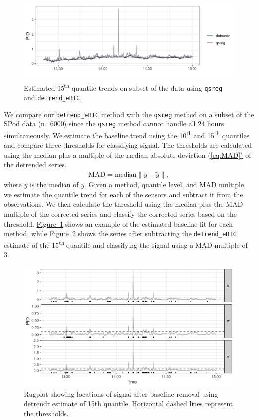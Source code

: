\documentclass[aoas]{imsart}
\newcommand{\Eqn}[1]{\hyperref[eq:#1]{{\rm (\ref*{eq:#1})}}} %
\newcommand{\Fig}[1]{\hyperref[fig:#1]{Figure~\ref*{fig:#1}}} %
\newcommand{\Eqn}[1]{{(\ref{eq:#1})}} %
\newcommand{\Fig}[1]{{Figure~\ref{fig:#1}}} %
\begin{document}
\begin{figure}
	\includegraphics[width = \linewidth]{Figures/short_trends.png}
	\caption{Estimated 15\textsuperscript{th} quantile trends on subset of the data using \texttt{qsreg} and \texttt{detrend\_eBIC}.}
	\label{fig:short-trends}
\end{figure}

We compare our \texttt{detrend\_eBIC} method with the \texttt{qsreg} method on a subset of the SPod data (n=6000) since the \texttt{qsreg} method cannot handle all 24 hours simultaneously. We estimate the baseline trend using the 10\textsuperscript{th} and 15\textsuperscript{th} quantiles and compare three thresholds for classifying signal. The thresholds are calculated using the median plus a multiple of the median absolute deviation \Eqn{MAD} of the detrended series.
\begin{eqnarray}
\label{eq:MAD}
\mbox{MAD} = \mbox{median}\lVert y-\tilde{y}\rVert,
\end{eqnarray}
where $\tilde{y}$ is the median of $y$. Given a method, quantile level, and MAD multiple, we estimate the quantile trend for each of the sensors and subtract it from the observations. We then calculate the threshold using the median plus the MAD multiple of the corrected series and classify the corrected series based on the threshold. \Fig{short-trends} shows an example of the estimated baseline fit for each method, while \Fig{rugplot} shows the series after subtracting the \texttt{detrend\_eBIC} estimate of the 15\textsuperscript{th} quantile and classifying the signal using a MAD multiple of 3.

\begin{figure}
	\includegraphics[width = \linewidth]{Figures/corrected_rugplot.png}
	\caption{Rugplot showing locations of signal after baseline removal using detrendr estimate of 15th quantile. Horizontal dashed lines represent the thresholds.}
	\label{fig:rugplot}
\end{figure}
\end{document}
